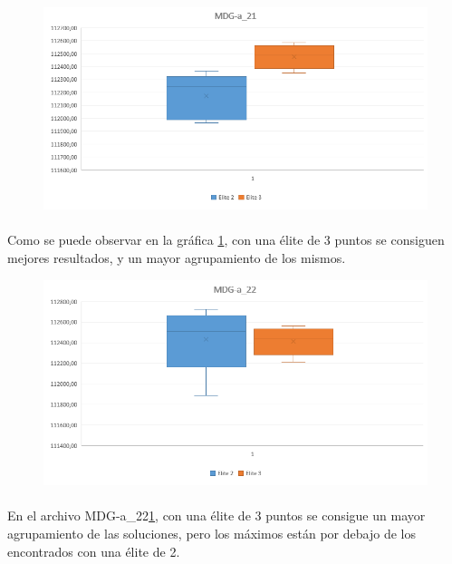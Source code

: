 	\begin{figure}[H]
		\centering
		\includegraphics[scale=0.65]{img/2point_2vs3/MDG1}
		\caption{}
		\label{MDGa1_2Puntos}
		
	\end{figure}

	\paragraph{}Como se puede observar en la gráfica \ref{MDGa1_2Puntos}, con una élite de 3 puntos se consiguen mejores resultados, y un mayor agrupamiento de los mismos.

	\begin{figure}[H]
		\centering
		\includegraphics[scale=0.65]{img/2point_2vs3/MDG2}
		\caption{}
		\label{MDGa2_2Puntos}
	
	\end{figure}

	\paragraph{}En el archivo MDG-a\_22\ref{MDGa1_2Puntos}, con una élite de 3 puntos se consigue un mayor agrupamiento de las soluciones, pero los máximos están por debajo de los encontrados con una élite de 2.
	
